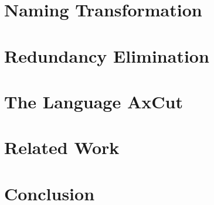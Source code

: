 \documentclass[nonacm]{acmart}
\begin{document}
\section{Naming Transformation}
\label{sec:naming-transformation}


\section{Redundancy Elimination}
\label{sec:redundancy-elimination}


\section{The Language AxCut}
\label{sec:axcut}


\section{Related Work}
\label{sec:related-work}


\section{Conclusion}
\label{sec:conclusion}



\end{document}
